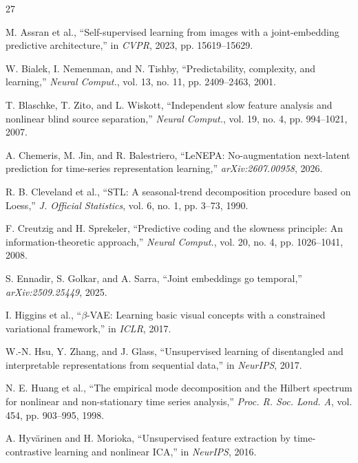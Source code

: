 \documentclass{article}
\begin{document}
\small
\begin{thebibliography}{27}
\setlength{\itemsep}{0pt}

 M. Assran et al., ``Self-supervised learning from images with a joint-embedding predictive architecture,'' in \emph{CVPR}, 2023, pp. 15619--15629.

 W. Bialek, I. Nemenman, and N. Tishby, ``Predictability, complexity, and learning,'' \emph{Neural Comput.}, vol. 13, no. 11, pp. 2409--2463, 2001.

 T. Blaschke, T. Zito, and L. Wiskott, ``Independent slow feature analysis and nonlinear blind source separation,'' \emph{Neural Comput.}, vol. 19, no. 4, pp. 994--1021, 2007.

 A. Chemeris, M. Jin, and R. Balestriero, ``LeNEPA: No-augmentation next-latent prediction for time-series representation learning,'' \emph{arXiv:2607.00958}, 2026.

 R. B. Cleveland et al., ``STL: A seasonal-trend decomposition procedure based on Loess,'' \emph{J. Official Statistics}, vol. 6, no. 1, pp. 3--73, 1990.

 F. Creutzig and H. Sprekeler, ``Predictive coding and the slowness principle: An information-theoretic approach,'' \emph{Neural Comput.}, vol. 20, no. 4, pp. 1026--1041, 2008.

 S. Ennadir, S. Golkar, and A. Sarra, ``Joint embeddings go temporal,'' \emph{arXiv:2509.25449}, 2025.

 I. Higgins et al., ``$\beta$-VAE: Learning basic visual concepts with a constrained variational framework,'' in \emph{ICLR}, 2017.

 W.-N. Hsu, Y. Zhang, and J. Glass, ``Unsupervised learning of disentangled and interpretable representations from sequential data,'' in \emph{NeurIPS}, 2017.

 N. E. Huang et al., ``The empirical mode decomposition and the Hilbert spectrum for nonlinear and non-stationary time series analysis,'' \emph{Proc. R. Soc. Lond. A}, vol. 454, pp. 903--995, 1998.

 A. Hyv\"{a}rinen and H. Morioka, ``Unsupervised feature extraction by time-contrastive learning and nonlinear ICA,'' in \emph{NeurIPS}, 2016.


\end{thebibliography}
\end{document}
